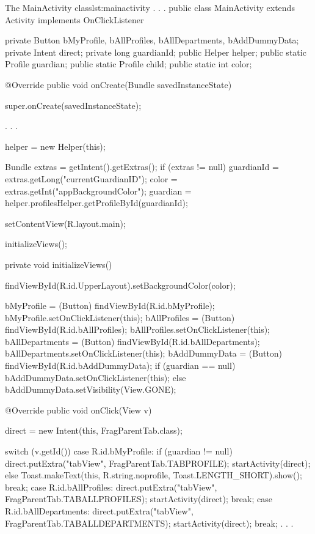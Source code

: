\begin{Java}{The MainActivity class}{lst:mainactivity}
.
.
.
public class MainActivity extends Activity implements OnClickListener {

	private Button bMyProfile, bAllProfiles, bAllDepartments, bAddDummyData;
	private Intent direct;
	private long guardianId;
	public Helper helper;
	public static Profile guardian;
	public static Profile child;
	public static int color;

	@Override
	public void onCreate(Bundle savedInstanceState){
		super.onCreate(savedInstanceState);

		.
		.
		.

		helper = new Helper(this);

		Bundle extras = getIntent().getExtras();
		if (extras != null) {        	   
			guardianId = extras.getLong("currentGuardianID");
			color = extras.getInt("appBackgroundColor");
			guardian = helper.profilesHelper.getProfileById(guardianId);
		}

		setContentView(R.layout.main);
		
		initializeViews();
	}

	private void initializeViews() {
		findViewById(R.id.UpperLayout).setBackgroundColor(color);
		
		bMyProfile = (Button) findViewById(R.id.bMyProfile);
		bMyProfile.setOnClickListener(this);
		bAllProfiles = (Button) findViewById(R.id.bAllProfiles);
		bAllProfiles.setOnClickListener(this);
		bAllDepartments = (Button) findViewById(R.id.bAllDepartments);
		bAllDepartments.setOnClickListener(this);
		bAddDummyData = (Button) findViewById(R.id.bAddDummyData);
		if (guardian == null) {
			bAddDummyData.setOnClickListener(this);
		} else {
			bAddDummyData.setVisibility(View.GONE);
		}
	}

	@Override
	public void onClick(View v) {
		direct = new Intent(this, FragParentTab.class);

		switch (v.getId()) {
		case R.id.bMyProfile:
			if (guardian != null) {
				direct.putExtra("tabView", FragParentTab.TABPROFILE);
				startActivity(direct);
			} else {
				Toast.makeText(this, R.string.noprofile, Toast.LENGTH_SHORT).show();
			}
			break;
		case R.id.bAllProfiles:
			direct.putExtra("tabView", FragParentTab.TABALLPROFILES);
			startActivity(direct);
			break;
		case R.id.bAllDepartments:
			direct.putExtra("tabView", FragParentTab.TABALLDEPARTMENTS);
			startActivity(direct);
			break;
		.
		.
		.
		}
	}
}
\end{Java}

